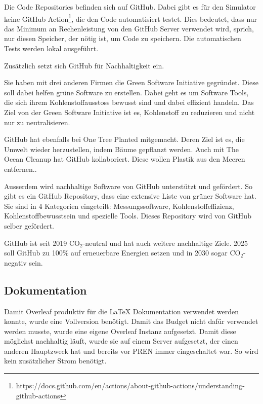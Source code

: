 Die Code Repositories befinden sich auf GitHub. Dabei gibt es für den Simulator keine GitHub Action\footnote{https://docs.github.com/en/actions/about-github-actions/understanding-github-actions}, die den Code automatisiert testet. Dies bedeutet, dass nur das Minimum an Rechenleistung von den GitHub Server verwendet wird, sprich, nur diesen Speicher, der nötig ist, um Code zu speichern. Die automatischen Tests werden lokal ausgeführt.

Zusätzlich setzt sich GitHub für Nachhaltigkeit ein.\cite{github-sustainability}

Sie haben mit drei anderen Firmen die Green Software Initiative gegründet. Diese soll dabei helfen grüne Software zu erstellen.  Dabei geht es um Software Tools, die sich ihrem Kohlenstoffausstoss bewusst sind und dabei effizient handeln. Das Ziel von der Green Software Initiative ist es, Kohlenstoff zu reduzieren und nicht nur zu neutralisieren.\cite{green-software-initiative}

GitHub hat ebenfalls bei One Tree Planted mitgemacht. Deren Ziel ist es, die Umwelt wieder herzustellen, indem Bäume gepflanzt werden\cite{one-tree-planted}. Auch mit The Ocean Cleanup hat GitHub kollaboriert. Diese wollen Plastik aus den Meeren entfernen.\cite{ocean-cleanup}.

Ausserdem wird nachhaltige Software von GitHub unterstützt und gefördert. So gibt es ein GitHub Repository, dass eine extensive Liste von grüner Software hat. Sie sind in 4 Kategorien eingeteilt: Messungssoftware, Kohlenstoffeffizienz, Kohlenstoffbewusstsein und spezielle Tools. Dieses Repository wird von GitHub selber gefördert.\cite{green-software}

GitHub ist seit 2019 CO$_{2}$-neutral und hat auch weitere nachhaltige Ziele. 2025 soll GitHub zu 100\% auf erneuerbare Energien setzen und in 2030 sogar CO$_{2}$-negativ sein.\cite{github-goals}







\subsection{Dokumentation}

Damit Overleaf produktiv für die LaTeX Dokumentation verwendet werden konnte, wurde eine Vollversion benötigt. Damit das Budget nicht dafür verwendet werden musste, wurde eine eigene Overleaf Instanz aufgesetzt. Damit diese möglichst nachhaltig läuft, wurde sie auf einem Server aufgesetzt, der einen anderen Hauptzweck hat und bereits vor PREN immer eingeschaltet war. So wird kein zusätzlicher Strom benötigt.

